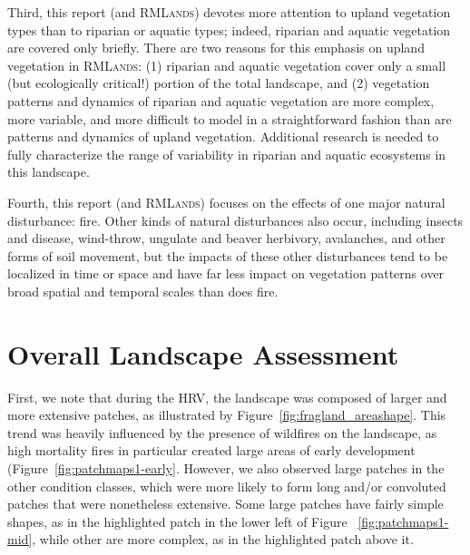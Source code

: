 Third, this report (and \textsc{RMLands}) devotes more attention to upland vegetation types than to riparian or aquatic types; indeed, riparian and aquatic vegetation are covered only briefly. There are two reasons for this emphasis on upland vegetation in \textsc{RMLands}: (1) riparian and aquatic vegetation cover only a small (but ecologically critical!) portion of the total landscape, and (2) vegetation patterns and dynamics of riparian and aquatic vegetation are more complex, more variable, and more difficult to model in a straightforward fashion than are patterns and dynamics of upland vegetation. Additional research is needed to fully characterize the range of variability in riparian and aquatic ecosystems in this landscape. 

Fourth, this report (and \textsc{RMLands}) focuses on the effects of one major natural disturbance: fire. Other kinds of natural disturbances also occur, including insects and disease, wind-throw, ungulate and beaver herbivory, avalanches, and other forms of soil movement, but the impacts of these other disturbances tend to be localized in time or space and have far less impact on vegetation patterns over broad spatial and temporal scales than does fire. 


\clearpage
\section{Overall Landscape Assessment}

First, we note that during the HRV, the landscape was composed of larger and more extensive patches, as illustrated by Figure~\ref{fig:fragland_areashape}. This trend was heavily influenced by the presence of wildfires on the landscape, as high mortality fires in particular created large areas of early development (Figure~\ref{fig:patchmaps1-early}. However, we also observed large patches in the other condition classes, which were more likely to form long and/or convoluted patches that were nonetheless extensive. Some large patches have fairly simple shapes, as in the highlighted patch in the lower left of Figure ~\ref{fig:patchmaps1-mid}, while other are more complex, as in the highlighted patch above it.

